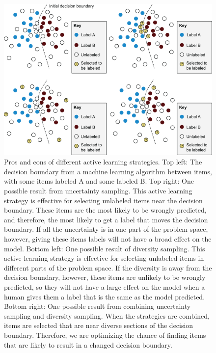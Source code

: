\documentclass[sigconf,nonacm,screen,pbalance]{acmart}
\begin{document}
\begin{figure}[ht]
\centering
\includegraphics[width=\columnwidth]{CH01_F02_Munro.png}
\vspace{-20pt}
\caption{Pros and cons of different active learning strategies. Top left: The decision
boundary from a machine learning algorithm between items, with some items labeled A and
some labeled B. Top right: One possible result from uncertainty sampling. This active
learning strategy is effective for selecting unlabeled items near the decision boundary.
These items are the most likely to be wrongly predicted, and therefore, the most likely
to get a label that moves the decision boundary. If all the uncertainty is in one part
of the problem space, however, giving these items labels will not have a broad effect on
the model. Bottom left: One possible result of diversity sampling. This active learning
strategy is effective for selecting unlabeled items in different parts of the problem
space. If the diversity is away from the decision boundary, however, these items are
unlikely to be wrongly predicted, so they will not have a large effect on the model when
a human gives them a label that is the same as the model predicted. Bottom right: One
possible result from combining uncertainty sampling and diversity sampling. When the
strategies are combined, items are selected that are near diverse sections of the
decision boundary. Therefore, we are optimizing the chance of finding items that are
likely to result in a changed decision boundary.}
\vspace{-15pt}
\label{fig:f2}
\end{figure}
\end{document}
